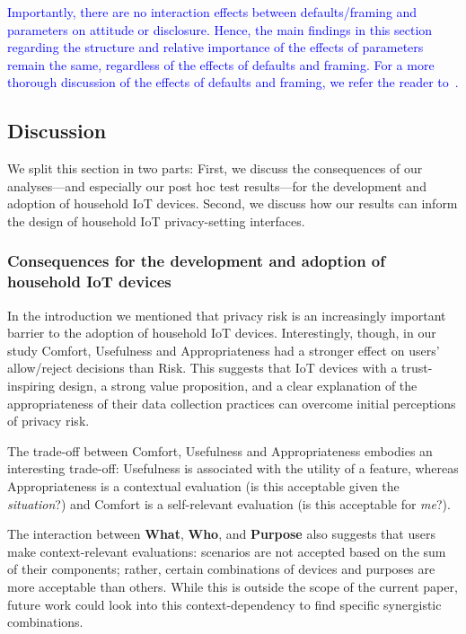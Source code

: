 \textcolor{blue}{Importantly, there are no interaction effects between defaults/framing and parameters on attitude or disclosure. Hence, the main findings in this section regarding the structure and relative importance of the effects of parameters remain the same, regardless of the effects of defaults and framing. For a more thorough discussion of the effects of defaults and framing, we refer the reader to~\cite{bahirat_exploring_2018}.}

\subsection{Discussion}
We split this section in two parts: First, we discuss the consequences of our analyses---and especially our post hoc test results---for the development and adoption of household IoT devices. Second, we discuss how our results can inform the design of household IoT privacy-setting interfaces.

\subsubsection{Consequences for the development and adoption of household IoT devices}
In the introduction we mentioned that privacy risk is an increasingly important barrier to the adoption of household IoT devices. Interestingly, though, in our study Comfort, Usefulness and Appropriateness had a stronger effect on users' allow/reject decisions than Risk. This suggests that IoT devices with a trust-inspiring design, a strong value proposition, and a clear explanation of the appropriateness of their data collection practices can overcome initial perceptions of privacy risk.

The trade-off between Comfort, Usefulness and Appropriateness embodies an interesting trade-off: Usefulness is associated with the utility of a feature, whereas Appropriateness is a contextual evaluation (is this acceptable given the \emph{situation}?) and Comfort is a self-relevant evaluation (is this acceptable for \emph{me}?).

The interaction between \textbf{What}, \textbf{Who}, and \textbf{Purpose} also suggests that users make context-relevant evaluations: scenarios are not accepted based on the sum of their components; rather, certain combinations of devices and purposes are more acceptable than others. While this is outside the scope of the current paper, future work could look into this context-dependency to find specific synergistic combinations. 

